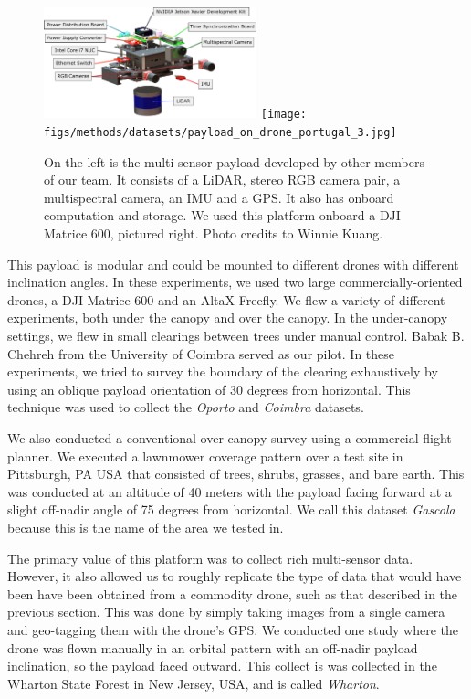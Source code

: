 \begin{figure}
    \centering
    \includegraphics[width=0.55\textwidth]{figs/methods/datasets/payload_annotated.pdf}
    \hfill
    \texttt{[image: figs/methods/datasets/payload\_on\_drone\_portugal\_3.jpg]}
    \caption{On the left is the multi-sensor payload developed by other members of our team. It consists of a LiDAR, stereo RGB camera pair, a multispectral camera, an IMU and a GPS. It also has onboard computation and storage. We used this platform onboard a DJI Matrice 600, pictured right. Photo credits to Winnie Kuang.}
    \label{fig:methods:payload}
\end{figure}

This payload is modular and could be mounted to different drones with different inclination angles. In these experiments, we used two large commercially-oriented drones, a DJI Matrice 600 and an AltaX Freefly. We flew a variety of different experiments, both under the canopy and over the canopy. In the under-canopy settings, we flew in small clearings between trees under manual control. Babak B. Chehreh from the University of Coimbra served as our pilot. In these experiments, we tried to survey the boundary of the clearing exhaustively by using an oblique payload orientation of 30 degrees from horizontal. This technique was used to collect the \textit{Oporto} and \textit{Coimbra} datasets.

We also conducted a conventional over-canopy survey using a commercial flight planner. We executed a lawnmower coverage pattern over a test site in Pittsburgh, PA USA that consisted of trees, shrubs, grasses, and bare earth. This was conducted at an altitude of 40 meters with the payload facing forward at a slight off-nadir angle of 75 degrees from horizontal. We call this dataset \textit{Gascola} because this is the name of the area we tested in.

The primary value of this platform was to collect rich multi-sensor data. However, it also allowed us to roughly replicate the type of data that would have been have been obtained from a commodity drone, such as that described in the previous section. This was done by simply taking images from a single camera and geo-tagging them with the drone's GPS. We conducted one study where the drone was flown manually in an orbital pattern with an off-nadir payload inclination, so the payload faced outward. This collect is was collected in the Wharton State Forest in New Jersey, USA, and is called \textit{Wharton}.



